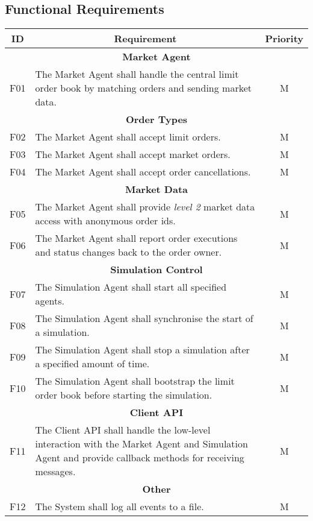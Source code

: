 \subsection{Functional Requirements}
\begin{center}
\begin{longtable}[htbp]{c p{3.5in} c }

\multicolumn{1}{c}{\textbf{ID}}           &
\multicolumn{1}{c}{\textbf{Requirement}}  &
\multicolumn{1}{c}{\textbf{Priority}}     \\              
\toprule

\multicolumn{3}{c}{\textbf{Market Agent}}   	         \\
F01  & The Market Agent shall handle the central limit order book by matching orders and sending market data. & M \\ 

\multicolumn{3}{c}{\textbf{Order Types}}   		         \\
F02  & The Market Agent shall accept limit orders.        & M \\
F03  & The Market Agent shall accept market orders.       & M \\
F04  & The Market Agent shall accept order cancellations. & M \\

\multicolumn{3}{c}{\textbf{Market Data}}   		         \\
F05  & The Market Agent shall provide \textit{level 2} market data access with anonymous order ids. & M \\
F06  & The Market Agent shall report order executions and status changes back to the order owner. & M \\ 

\multicolumn{3}{c}{\textbf{Simulation Control}}   \\
F07  & The Simulation Agent shall start all specified agents.  & M \\
F08  & The Simulation Agent shall synchronise the start of a simulation. & M \\
F09  & The Simulation Agent shall stop a simulation after a specified amount of time. & M \\
F10  & The Simulation Agent shall bootstrap the limit order book before starting the simulation. & M \\ 

\multicolumn{3}{c}{\textbf{Client API}}   \\
F11  & The Client API shall handle the low-level interaction with the Market Agent and Simulation Agent and provide callback methods for receiving messages. & M \\

\multicolumn{3}{c}{\textbf{Other}}   		             \\
F12  & The System shall log all events to a file.        & M \\
         
\end{longtable}
\end{center}

